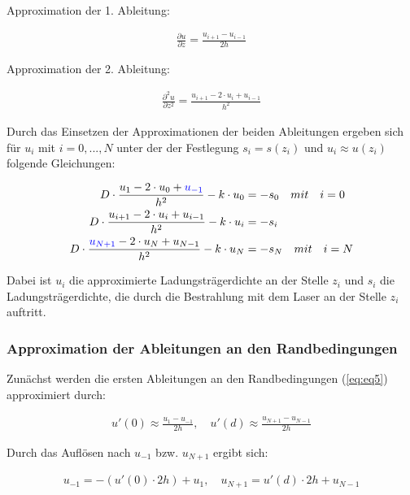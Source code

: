 \documentclass[
	pagesize,
	fontsize=12pt,
	paper=a4,
	oneside,
   reqno
]{scrartcl}
\begin{document}
Approximation der 1. Ableitung:

\begin{align*}
   \frac{\partial u}{\partial z} = \frac{u_{i+1}-u_{i-1}}{2h}
\end{align*}

Approximation der 2. Ableitung:

\begin{align*}
   \frac{\partial^2 u}{\partial z^2} = \frac{u_{i+1}-2\cdot u_i+u_{i-1}}{h^2}
\end{align*}

Durch das Einsetzen der Approximationen der beiden Ableitungen ergeben sich für $u_i$ mit $i=0, ... ,N$ unter der der Festlegung $s_i = s(z_i)$ und $u_i \approx u(z_i)$ folgende Gleichungen:

\begin{align*}
   D\cdot \frac{u_1-2\cdot u_0+\textcolor{blue}{u_{-1}}}{h^2} - k\cdot u_0 &= -s_0 \quad mit \quad i = 0 \\
   D\cdot \frac{u_{i+1}-2\cdot u_i+u_{i-1}}{h^2} - k\cdot u_i &= -s_i \\
   D\cdot \frac{\textcolor{blue}{u_{N+1}}-2\cdot u_N+u_{N-1}}{h^2} - k\cdot u_N &= -s_N \quad mit \quad i = N \\
\end{align*}

Dabei ist $u_i$ die approximierte Ladungsträgerdichte an der Stelle $z_i$ und $s_i$ die Ladungsträgerdichte, die durch die Bestrahlung mit dem Laser an der Stelle $z_i$ auftritt. \\

\subsubsection{Approximation der Ableitungen an den Randbedingungen}

Zunächst werden die ersten Ableitungen an den Randbedingungen (\autoref{eq:eq5}) approximiert durch:

\begin{align*}
   u'(0) \approx \frac{u_1-u_{-1}}{2h}, \quad u'(d) \approx \frac{u_{N+1}-u_{N-1}}{2h}
\end{align*}

Durch das Auflösen nach $u_{-1}$ bzw. $u_{N+1}$ ergibt sich:

\begin{align*}
   u_{-1} = -(u'(0)\cdot 2h) + u_1, \quad u_{N+1} = u'(d)\cdot 2h + u_{N-1}
\end{align*}
\end{document}
